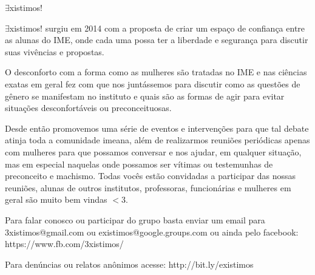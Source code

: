 \begin{subsecao}{$\exists$xistimos!}


$\exists$xistimos! surgiu em  2014 com a proposta de criar um espaço de
confiança entre as alunas do IME, onde cada uma possa ter a liberdade e
segurança para discutir suas vivências e propostas.

O desconforto com a forma como as mulheres são tratadas no IME e nas ciências
exatas em geral fez com que nos juntássemos para discutir como as questões de
gênero se manifestam no instituto e quais são as formas de agir para evitar
situações desconfortáveis ou preconceituosas.

Desde então promovemos uma série de eventos e intervenções para que tal debate
atinja toda a comunidade imeana, além de realizarmos reuniões periódicas apenas
com mulheres para que possamos conversar e nos ajudar, em qualquer situação,
mas em especial naquelas onde possamos ser vítimas ou testemunhas de preconceito e
machismo. Todas vocês estão convidadas a participar das nossas reuniões, 
alunas de outros institutos, professoras, funcionárias e mulheres
em geral são muito bem vindas $<$3. 

Para falar conosco ou participar do grupo basta enviar um email
para 3xistimos@gmail.com ou existimos@google.groups.com ou ainda pelo facebook:
https://www.fb.com/3xistimos/

Para denúncias ou relatos anônimos acesse: http://bit.ly/existimos
\end{subsecao}
